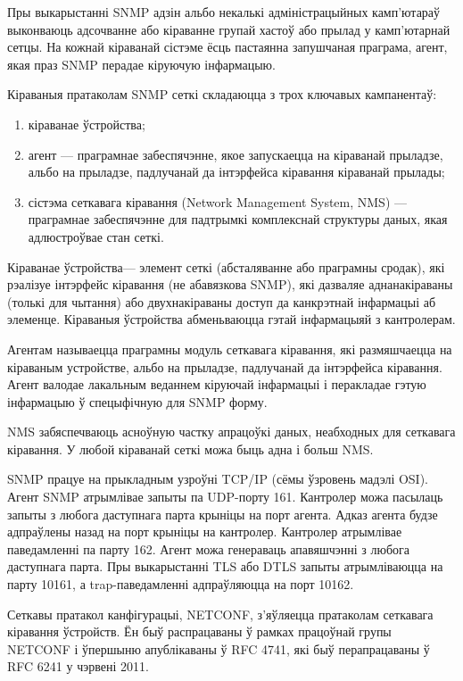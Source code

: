 Пры выкарыстанні SNMP адзін альбо некалькі адміністрацыйных камп'ютараў выконваюць адсочванне або кіраванне групай хастоў або прылад у камп'ютарнай сетцы. На кожнай кіраванай сістэме ёсць пастаянна запушчаная праграма, агент, якая праз SNMP перадае кіруючую інфармацыю.

Кіраваныя пратаколам SNMP сеткі складаюцца з трох ключавых кампанентаў:
\begin{enumerate}
    \item кіраванае ўстройства;
    \item агент --- праграмнае забеспячэнне, якое запускаецца на кіраванай прыладзе, альбо на прыладзе, падлучанай да інтэрфейса кіравання кіраванай прылады;
    \item сістэма сеткавага кіравання (Network Management System, NMS) --- праграмнае забеспячэнне для падтрымкі комплекснай структуры даных, якая адлюстроўвае стан сеткі.
\end{enumerate}

Кіраванае ўстройства--- элемент сеткі (абсталяванне або праграмны сродак), які рэалізуе інтэрфейс кіравання (не абавязкова SNMP), які дазваляе аднанакіраваны (толькі для чытання) або двухнакіраваны доступ да канкрэтнай інфармацыі аб элеменце. Кіраваныя ўстройства абменьваюцца гэтай інфармацыяй з кантролерам.

Агентам называецца праграмны модуль сеткавага кіравання, які размяшчаецца на кіраваным устройстве, альбо на прыладзе, падлучанай да інтэрфейса кіравання. Агент валодае лакальным веданнем кіруючай інфармацыі і перакладае гэтую інфармацыю ў спецыфічную для SNMP форму.

NMS забяспечваюць асноўную частку апрацоўкі даных, неабходных для сеткавага кіравання. У любой кіраванай сеткі можа быць адна і больш NMS.

SNMP працуе на прыкладным узроўні TCP/IP (сёмы ўзровень мадэлі OSI). Агент SNMP атрымлівае запыты па UDP-порту 161. Кантролер можа пасылаць запыты з любога даступнага парта крыніцы на порт агента. Адказ агента будзе адпраўлены назад на порт крыніцы на кантролер. Кантролер атрымлівае паведамленні па парту 162. Агент можа генераваць апавяшчэнні з любога даступнага парта. Пры выкарыстанні TLS або DTLS запыты атрымліваюцца на парту 10161, а trap-паведамленні адпраўляюцца на порт 10162.

Сеткавы пратакол канфігурацыі, NETCONF, з'яўляецца пратаколам сеткавага кіравання ўстройств. Ён быў распрацаваны ў рамках працоўнай групы NETCONF і ўпершыню апублікаваны ў RFC 4741, які быў перапрацаваны ў RFC 6241 у чэрвені 2011.


